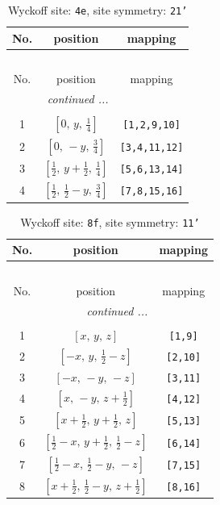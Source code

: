 \documentclass[fleqn,8pt]{jsarticle}
\begin{document}
\renewcommand{\arraystretch}{1.2}
\begin{longtable}{ccc}
\caption{Wyckoff site: {\tt 4e}, site symmetry: {\tt 21'}}
 \\
 \hline \hline
No. & position & mapping \\ \hline \endfirsthead

\multicolumn{2}{l}{\tablename\ \thetable{}} \\
 \hline \hline
No. & position & mapping \\ \hline \endhead

 \hline \hline
\multicolumn{2}{r}{\footnotesize\it continued ...} \\ \endfoot

 \hline \hline
\multicolumn{2}{r}{} \\ \endlastfoot

1 & $\left[ 0,\, y,\, \frac{1}{4} \right]$ & {\tt [1,2,9,10]} \\ \hline
2 & $\left[ 0,\, - y,\, \frac{3}{4} \right]$ & {\tt [3,4,11,12]} \\ \hline
3 & $\left[ \frac{1}{2},\, y + \frac{1}{2},\, \frac{1}{4} \right]$ & {\tt [5,6,13,14]} \\ \hline
4 & $\left[ \frac{1}{2},\, \frac{1}{2} - y,\, \frac{3}{4} \right]$ & {\tt [7,8,15,16]} \\
\end{longtable}
\renewcommand{\arraystretch}{1.2}
\begin{longtable}{ccc}
\caption{Wyckoff site: {\tt 8f}, site symmetry: {\tt 11'}}
 \\
 \hline \hline
No. & position & mapping \\ \hline \endfirsthead

\multicolumn{2}{l}{\tablename\ \thetable{}} \\
 \hline \hline
No. & position & mapping \\ \hline \endhead

 \hline \hline
\multicolumn{2}{r}{\footnotesize\it continued ...} \\ \endfoot

 \hline \hline
\multicolumn{2}{r}{} \\ \endlastfoot

1 & $\left[ x,\, y,\, z \right]$ & {\tt [1,9]} \\ \hline
2 & $\left[ - x,\, y,\, \frac{1}{2} - z \right]$ & {\tt [2,10]} \\ \hline
3 & $\left[ - x,\, - y,\, - z \right]$ & {\tt [3,11]} \\ \hline
4 & $\left[ x,\, - y,\, z + \frac{1}{2} \right]$ & {\tt [4,12]} \\ \hline
5 & $\left[ x + \frac{1}{2},\, y + \frac{1}{2},\, z \right]$ & {\tt [5,13]} \\ \hline
6 & $\left[ \frac{1}{2} - x,\, y + \frac{1}{2},\, \frac{1}{2} - z \right]$ & {\tt [6,14]} \\ \hline
7 & $\left[ \frac{1}{2} - x,\, \frac{1}{2} - y,\, - z \right]$ & {\tt [7,15]} \\ \hline
8 & $\left[ x + \frac{1}{2},\, \frac{1}{2} - y,\, z + \frac{1}{2} \right]$ & {\tt [8,16]} \\
\end{longtable}
\end{document}
